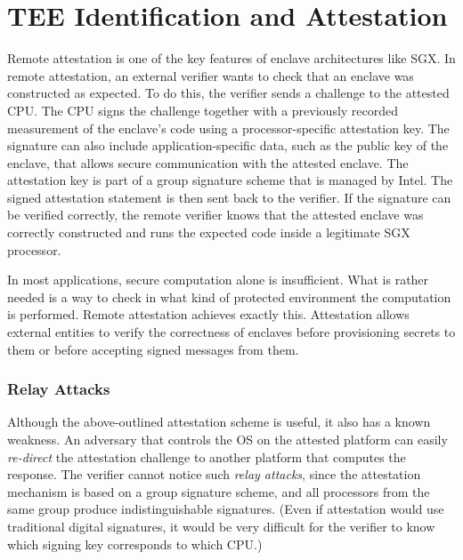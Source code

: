 
\section*{TEE Identification and Attestation}

Remote attestation is one of the key features of enclave architectures like SGX. In remote attestation, an external verifier wants to check that an enclave was constructed as expected. To do this, the verifier sends a challenge to the attested CPU. The CPU signs the challenge together with a previously recorded measurement of the enclave's code using a processor-specific attestation key. The signature can also include application-specific data, such as the public key of the enclave, that allows secure communication with the attested enclave. The attestation key is part of a group signature scheme that is managed by Intel. The signed attestation statement is then sent back to the verifier. If the signature can be verified correctly, the remote verifier knows that the attested enclave was correctly constructed and runs the expected code inside a legitimate SGX processor. 

In most applications, secure computation alone is insufficient. What is rather needed is a way to check in what kind of protected environment the computation is performed. Remote attestation achieves exactly this. Attestation allows external entities to verify the correctness of enclaves before provisioning secrets to them or before accepting signed messages from them.  

\subsubsection*{Relay Attacks}

Although the above-outlined attestation scheme is useful, it also has a known weakness. %
An adversary that controls the OS on the attested platform can easily \emph{re-direct} the attestation challenge to another platform that computes the response. 
%
The verifier cannot notice such \emph{relay attacks}, since the attestation mechanism is based on a group signature scheme, and all processors from the same group produce indistinguishable signatures. (Even if attestation would use traditional digital signatures, it would be very difficult for the verifier to know which signing key corresponds to which CPU.) 


